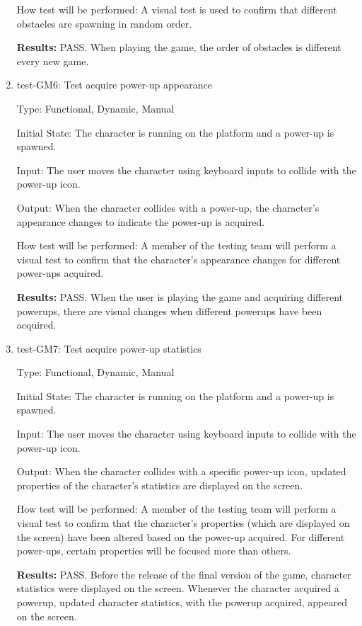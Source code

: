 \documentclass[12pt, titlepage]{article}
\begin{document}
\begin{enumerate}
How test will be performed: A visual test is used to confirm that different obstacles are spawning in random order.

\textbf{Results:} PASS. When playing the game, the order of obstacles is different every new game.

\item{test-GM6: Test acquire power-up appearance\\}

Type: Functional, Dynamic, Manual
					
Initial State: The character is running on the platform and a power-up is spawned.
					
Input: The user moves the character using keyboard inputs to collide with the power-up icon.

Output: When the character collides with a power-up, the character's appearance changes to indicate the power-up is acquired.
					
How test will be performed: A member of the testing team will perform a visual test to confirm that the character's appearance changes for different power-ups acquired.

\textbf{Results:} PASS. When the user is playing the game and acquiring different powerups, there are visual changes when different powerups have been acquired. 


\item{test-GM7: Test acquire power-up statistics\\}

Type: Functional, Dynamic, Manual
					
Initial State: The character is running on the platform and a power-up is spawned.
					
Input: The user moves the character using keyboard inputs to collide with the power-up icon.

Output: When the character collides with a specific power-up icon, updated properties of the character's statistics are displayed on the screen.
					
How test will be performed: A member of the testing team will perform a visual test to confirm that the character's properties (which are displayed on the screen) have been altered based on the power-up acquired. For different power-ups, certain properties will be focused more than others. 

\textbf{Results:} PASS. Before the release of the final version of the game, character statistics were displayed on the screen. Whenever the character acquired a powerup, updated character statistics, with the powerup acquired, appeared on the screen.


\end{enumerate}
\end{document}

